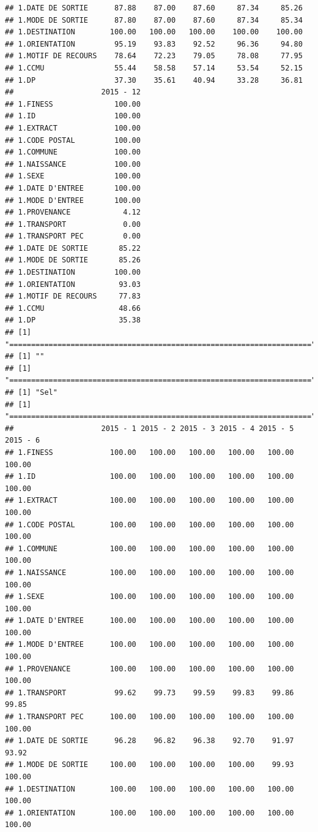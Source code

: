 \documentclass[]{article}
\begin{document}
\begin{verbatim}
## 1.DATE DE SORTIE      87.88    87.00    87.60     87.34     85.26
## 1.MODE DE SORTIE      87.80    87.00    87.60     87.34     85.34
## 1.DESTINATION        100.00   100.00   100.00    100.00    100.00
## 1.ORIENTATION         95.19    93.83    92.52     96.36     94.80
## 1.MOTIF DE RECOURS    78.64    72.23    79.05     78.08     77.95
## 1.CCMU                55.44    58.58    57.14     53.54     52.15
## 1.DP                  37.30    35.61    40.94     33.28     36.81
##                    2015 - 12
## 1.FINESS              100.00
## 1.ID                  100.00
## 1.EXTRACT             100.00
## 1.CODE POSTAL         100.00
## 1.COMMUNE             100.00
## 1.NAISSANCE           100.00
## 1.SEXE                100.00
## 1.DATE D'ENTREE       100.00
## 1.MODE D'ENTREE       100.00
## 1.PROVENANCE            4.12
## 1.TRANSPORT             0.00
## 1.TRANSPORT PEC         0.00
## 1.DATE DE SORTIE       85.22
## 1.MODE DE SORTIE       85.26
## 1.DESTINATION         100.00
## 1.ORIENTATION          93.03
## 1.MOTIF DE RECOURS     77.83
## 1.CCMU                 48.66
## 1.DP                   35.38
## [1] "====================================================================="
## [1] ""
## [1] "====================================================================="
## [1] "Sel"
## [1] "====================================================================="
##                    2015 - 1 2015 - 2 2015 - 3 2015 - 4 2015 - 5 2015 - 6
## 1.FINESS             100.00   100.00   100.00   100.00   100.00   100.00
## 1.ID                 100.00   100.00   100.00   100.00   100.00   100.00
## 1.EXTRACT            100.00   100.00   100.00   100.00   100.00   100.00
## 1.CODE POSTAL        100.00   100.00   100.00   100.00   100.00   100.00
## 1.COMMUNE            100.00   100.00   100.00   100.00   100.00   100.00
## 1.NAISSANCE          100.00   100.00   100.00   100.00   100.00   100.00
## 1.SEXE               100.00   100.00   100.00   100.00   100.00   100.00
## 1.DATE D'ENTREE      100.00   100.00   100.00   100.00   100.00   100.00
## 1.MODE D'ENTREE      100.00   100.00   100.00   100.00   100.00   100.00
## 1.PROVENANCE         100.00   100.00   100.00   100.00   100.00   100.00
## 1.TRANSPORT           99.62    99.73    99.59    99.83    99.86    99.85
## 1.TRANSPORT PEC      100.00   100.00   100.00   100.00   100.00   100.00
## 1.DATE DE SORTIE      96.28    96.82    96.38    92.70    91.97    93.92
## 1.MODE DE SORTIE     100.00   100.00   100.00   100.00    99.93   100.00
## 1.DESTINATION        100.00   100.00   100.00   100.00   100.00   100.00
## 1.ORIENTATION        100.00   100.00   100.00   100.00   100.00   100.00

\end{verbatim}
\end{document}
